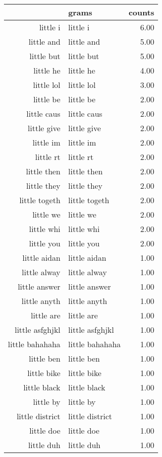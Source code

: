 \begin{table}[ht]
\centering
\begin{tabular}{rlr}
  \hline
 & grams & counts \\ 
  \hline
little i & little i & 6.00 \\ 
  little and & little and & 5.00 \\ 
  little but & little but & 5.00 \\ 
  little he & little he & 4.00 \\ 
  little lol & little lol & 3.00 \\ 
  little be & little be & 2.00 \\ 
  little caus & little caus & 2.00 \\ 
  little give & little give & 2.00 \\ 
  little im & little im & 2.00 \\ 
  little rt & little rt & 2.00 \\ 
  little then & little then & 2.00 \\ 
  little they & little they & 2.00 \\ 
  little togeth & little togeth & 2.00 \\ 
  little we & little we & 2.00 \\ 
  little whi & little whi & 2.00 \\ 
  little you & little you & 2.00 \\ 
  little aidan & little aidan & 1.00 \\ 
  little alway & little alway & 1.00 \\ 
  little answer & little answer & 1.00 \\ 
  little anyth & little anyth & 1.00 \\ 
  little are & little are & 1.00 \\ 
  little asfghjkl & little asfghjkl & 1.00 \\ 
  little bahahaha & little bahahaha & 1.00 \\ 
  little ben & little ben & 1.00 \\ 
  little bike & little bike & 1.00 \\ 
  little black & little black & 1.00 \\ 
  little by & little by & 1.00 \\ 
  little district & little district & 1.00 \\ 
  little doe & little doe & 1.00 \\ 
  little duh & little duh & 1.00 \\ 

\end{tabular}
\end{table}
